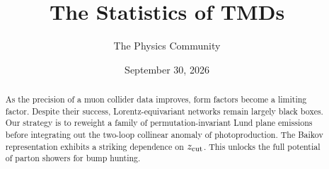\documentclass[11pt]{article}
\title{The Statistics of TMDs}
\author{The Physics Community}
\date{September 30, 2026}
\begin{document}
\maketitle
\begin{abstract}
As the precision of a muon collider data improves, form factors become a
limiting factor. Despite their success, Lorentz-equivariant networks
remain largely black boxes. Our strategy is to reweight a family of
permutation-invariant Lund plane emissions before integrating out the
two-loop collinear anomaly of photoproduction. The Baikov representation
exhibits a striking dependence on $z_{\rm cut}$. This unlocks the full
potential of parton showers for bump hunting.
\end{abstract}
\tableofcontents




\nocite{*}


\end{document}
